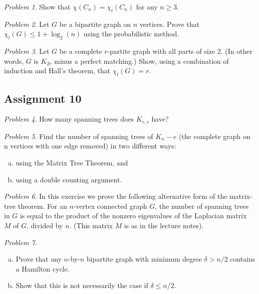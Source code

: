 \documentclass[11pt, fleqn, a4paper, landscape]{article}
\theoremstyle{plain} %
\theoremstyle{remark} %
\newtheorem{problem}{Problem}
\theoremstyle{definition} %
\begin{document}
\begin{multicols}{3}
\begin{problem}
Show that $\chi(C_n) = \chi_l(C_n)$ for any $n \ge 3$.
\end{problem}

\begin{problem}
Let $G$ be a bipartite graph on $n$ vertices. Prove that $\chi_l(G)\le 1 + \log_2(n)$ using the probabilistic method.
\end{problem}

\begin{problem}
Let $G$ be a complete $r$-partite graph with all parts of size 2. (In other words, $G$ is $K_{2r}$ minus a perfect matching.) Show, using a combination of induction and Hall's theorem, that $\chi_l(G) = r$.
\end{problem}

\subsection{Assignment 10}

\begin{problem}
How many spanning trees does $K_{r,s}$ have?
\end{problem}

\begin{problem}
Find the number of spanning trees of $K_n- e$ (the complete graph on n vertices with one edge removed) in two different ways:
\begin{enumerate}[(a)]
\item using the Matrix Tree Theorem, and 
\item using a double counting argument.
\end{enumerate} 
\end{problem}

\begin{problem}
In this exercise we prove the following alternative form of the matrix-tree theorem. For an $n$-vertex connected graph $G$, the number of spanning trees in $G$ is equal to the product of the  nonzero eigenvalues of the Laplacian matrix $M$ of $G$, divided by $n$. (This matrix $M$ is as in the lecture notes).
\end{problem}

\begin{problem}
\begin{enumerate}[(a)]
\item Prove that any $n$-by-$n$ bipartite graph with minimum degree $\delta > n/2$ contains a Hamilton cycle.
\item  Show that this is not necessarily the case if $\delta\le n/2$.
\end{enumerate}
\end{problem}


\end{multicols}
\end{document}
